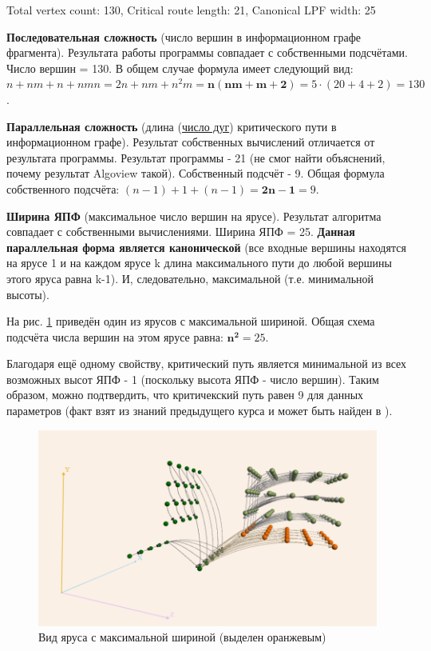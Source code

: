 \documentclass[12pt, fleqn]{article}
\theoremstyle{definition}
\newenvironment{packed_enum}{
\begin{enumerate}
  \setlength{\itemsep}{1pt}
  \setlength{\parskip}{0pt}
  \setlength{\parsep}{0pt}
}{\end{enumerate}}
\begin{document}
Total vertex count: 130, Critical route length: 21, Canonical LPF width: 25
\begin{packed_enum}
 \item \textbf{Последовательная сложность} (число вершин в информационном графе фрагмента). Результата работы программы совпадает с собственными подсчётами. Число вершин = 130. 
 В общем случае формула имеет следующий вид: \\ $n + nm + n + nmn = 2n + nm + n^2m = \mathbf{n(nm + m + 2 )} = 5\cdot(20 + 4 + 2) = 130$.
 \item \textbf{Параллельная сложность} (длина (\underline{число дуг}) критического пути в информационном графе). Результат собственных вычислений отличается от результата программы. Результат программы - 21 (не смог найти объяснений, почему результат Algoview такой). Собственный подсчёт - 9. Общая формула собственного подсчёта: $(n - 1) + 1 + (n - 1) = \mathbf{2n - 1} = 9$.

 \item \textbf{Ширина ЯПФ} (максимальное число вершин на ярусе). Результат алгоритма совпадает с собственными вычислениями. Ширина ЯПФ = 25. 
 \textbf{Данная параллельная форма является канонической} (все входные вершины находятся на ярусе 1 и на каждом ярусе k длина максимального пути до любой вершины этого яруса равна k-1). И, следовательно, максимальной (т.е. минимальной высоты).
 
 На рис. \ref{fig:max_lpf} приведён один из ярусов с максимальной шириной. Общая схема подсчёта числа вершин на этом ярусе равна: $\mathbf{n^2} = 25$.
 
 Благодаря ещё одному свойству, критический путь является минимальной из всех возможных высот ЯПФ - 1 (поскольку высота ЯПФ - число вершин). Таким образом, можно подтвердить, что критичекский путь равен 9 для данных параметров (факт взят из знаний предыдущего курса и может быть найден в \cite{Voevodin02}).
 
 \begin{figure}[ht]
\begin{center}
 \includegraphics[scale=1]{max_lpf.png}
 \caption{Вид яруса с максимальной шириной (выделен оранжевым)}
 \label{fig:max_lpf}
\end{center}
\end{figure}


\end{packed_enum}
\end{document}
